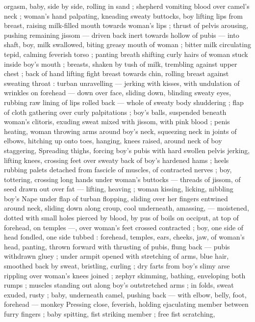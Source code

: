 orgasm, baby, side by side, rolling in sand ; shepherd vomiting blood 
over camel's neck ; woman's hand palpating, kneading sweaty 
buttocks, boy lifting lips from breast, raising milk-filled mouth 
towards woman's lips ; thrust of pelvis arousing, pushing remaining 
jissom --- driven back inert towards hollow of pubis --- into shaft, 
boy, milk swallowed, biting greasy mouth of woman ; bitter milk 
circulating tepid, calming feverish torso ; panting breath shifting 
curly hairs of woman stuck inside boy's mouth ; breasts, shaken by 
tush of milk, trembling against upper chest ; back of hand lifting 
fight breast towards chin, rolling breast against sweating throat : 
turban unravelling --- jerking with kisses, with undulation of wrinkles 
on forehead --- down over face, sliding down, blinding sweaty eyes, 
rubbing raw lining of lips rolled back --- whole of sweaty body 
shuddering ; flap of cloth gathering over curly palpitations ; boy's 
balls, suspended beneath woman's clitoris, exuding sweat mixed with 
jissom, with pink blood ; penis heating, woman throwing arms around 
boy's neck, squeezing neck in joints of elbows, hitching up onto 
toes, hanging, knees raised, around neck of boy staggering, 
Spreading thighs, forcing boy's pubis with hard swollen pelvis 
jerking, lifting knees, crossing feet over sweaty back of boy's 
hardened hams ; heels rubbing palets detached from fascicle of 
muscles, of contracted nerves ; boy, tottering, crossing long hands 
under woman's buttocks --- threads of jissom, of seed drawn out 
over fat --- lifting, heaving ; woman kissing, licking, nibbling boy's 
Nape under flap of turban flopping, sliding over her fingers entwined 
around neck, sliding down along croup, cool underneath, amassing, 
--- moistened, dotted with small holes pierced by blood, by pus of 
boils on occiput, at top of forehead, on temples ---, over woman's 
feet crossed contracted ; boy, one side of head fondled, one side 
tubbed : forehead, temples, ears, cheeks, jaw, of woman's head, 
panting, thrown forward with thrusting of pubis, flung back --- pubis 
withdrawn gluey ; under armpit opened with stretching of arms, blue 
hair, smoothed back by sweat, bristling, curling ; dry farts from boy's 
slimy arse rippling over woman's knees joined ; zephyr skimming, 
bathing, enveloping both rumps ; muscles standing out along boy's 
outstretched arms ; in folds, sweat exuded, rusty ; baby, underneath 
camel, pushing back --- with elbow, belly, foot, forehead --- monkey 
Pressing close, feverish, holding ejaculating member between furry 
fingers ; baby spitting, fist striking member ; free fist scratching, 
